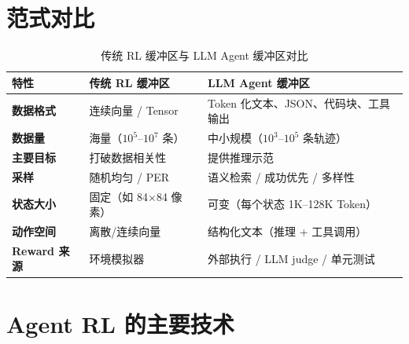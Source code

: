 \section{范式对比}
\label{paradigm-comparison}

\begin{table}[ht!]
\centering\small
\caption{传统 RL 缓冲区与 LLM Agent 缓冲区对比}
\begin{tabularx}{0.88\linewidth}{@{}l Z{0.77} Z{1.23}@{}}
\toprule
\textbf{特性} & \textbf{传统 RL 缓冲区} & \textbf{LLM Agent 缓冲区} \\
\midrule
\textbf{数据格式} & 连续向量 / Tensor & Token 化文本、JSON、代码块、工具输出 \\
\textbf{数据量} & 海量（$10^5$--$10^7$ 条） & 中小规模（$10^3$--$10^5$ 条轨迹） \\
\textbf{主要目标} & 打破数据相关性 & 提供推理示范 \\
\textbf{采样} & 随机均匀 / PER & 语义检索 / 成功优先 / 多样性 \\
\textbf{状态大小} & 固定（如 84$\times$84 像素） & 可变（每个状态 1K--128K Token） \\
\textbf{动作空间} & 离散/连续向量 & 结构化文本（推理 + 工具调用） \\
\textbf{Reward 来源} & 环境模拟器 & 外部执行 / LLM judge / 单元测试 \\
\bottomrule
\end{tabularx}
\end{table}

\section{Agent RL 的主要技术}
\label{major-techniques-in-agentic-rl}

